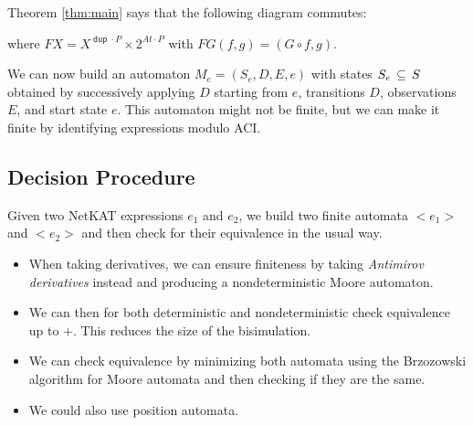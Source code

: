 \documentclass{article}
\newcommand\At{\ensuremath{\mathit{At}}}
\newcommand\pdup{\mathop{\mathsf{dup}}}
\newcommand\Exp{\mathsf{Exp}}
\newcommand\pair[2]{\langle #1,#2\rangle}
\begin{document}
Theorem \ref{thm:main} says that the following diagram commutes:
\begin{center}
\end{center}
where $FX = X^{\pdup\cdot P}\times 2^{\At\cdot P}$ with $FG(f,g) = (G\circ f,g)$.

We can now build an automaton $M_e = (S_e, D, E, e)$ with states $S_e\,\subseteq\, S$ obtained by successively applying $D$ starting from $e$, transitions $D$, observations $E$, and start state $e$. This automaton might not be finite, but we can make it  finite by identifying expressions modulo ACI.

\subsection{Decision Procedure}

Given two NetKAT expressions $e_1$ and $e_2$, we build two finite automata $<e_1>$ and $<e_2>$ and then check for their equivalence in the usual way. 

\begin{itemize}
\item When taking derivatives, we can ensure finiteness by taking \emph{Antimirov derivatives} instead and producing a nondeterministic Moore automaton. 
\item We can then for both deterministic and nondeterministic check equivalence up to $+$. This reduces the size of the bisimulation. 
\item We can check equivalence by minimizing both automata using the Brzozowski algorithm for Moore automata and then checking if they are the same. 
\item We could also use position automata. 
\end{itemize}

\newcommand{\todo}{\textsf{todo}}
\renewcommand{\algorithmicrequire}{\textbf{Input:}}
\renewcommand{\algorithmicensure}{\textbf{Output:}}
\renewcommand{\algorithmiccomment}[1]{\hfill$\triangleleft$ {\footnotesize #1}}
\end{document}
